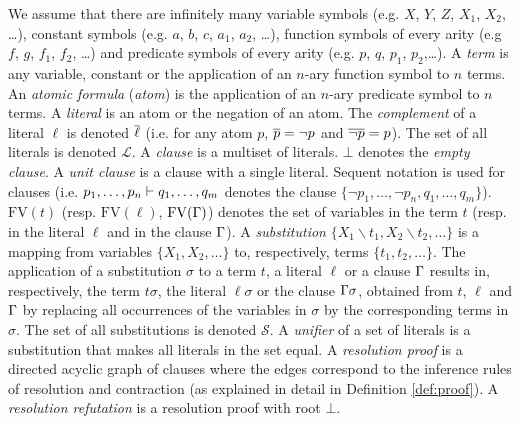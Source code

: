 \documentclass{llncs}
\newcommand{\freevar}[1]{\mathrm{FV}(#1)}
\begin{document}
We assume that there are infinitely many variable symbols (e.g. $X$, $Y$, $Z$, $X_1$, $X_2$, \ldots), constant symbols (e.g. $a$, $b$, $c$, $a_1$, $a_2$, \ldots), function symbols of every arity (e.g $f$, $g$, $f_1$, $f_2$, \ldots) and predicate symbols of every arity (e.g. $p$, $q$, $p_1$, $p_2$,\ldots). A \emph{term} is any variable, constant or the application of an $n$-ary function symbol to $n$ terms.
An \emph{atomic formula} (\emph{atom}) is the application of an $n$-ary predicate symbol to $n$ terms. A \emph{literal} is an atom or the negation of an atom. The
\emph{complement} of a literal $\ell$ is denoted $\overline{\ell}$ (i.e. for any atom $p$,
$\overline{p} = \neg p$ and $\overline{\neg p} = p$). The set of all literals is denoted $\mathcal{L}$. A
\emph{clause} is a multiset of literals. $\bot$ denotes the \emph{empty clause}. A \emph{unit clause} is a clause with a single literal. Sequent notation is used for clauses (i.e. $p_1,\ldots,p_n \vdash q_1,\ldots, q_m$ denotes the clause $\{ \neg p_1,\ldots, \neg p_n, q_1, \ldots, q_m \}$).
$\freevar{t}$ (resp. $\freevar{\ell}$, $\freevar{\clause}$) denotes the set of variables in the term $t$ (resp. in the literal $\ell$ and in the clause $\Gamma$).
A \emph{substitution} $\{ X_1\backslash t_1, X_2 \backslash t_2, \ldots \}$ is a mapping from variables $\{ X_1, X_2, \ldots \}$ to, respectively, terms $\{t_1, t_2, \ldots \}$. The application of a substitution $\sigma$ to a term $t$, a literal $\ell$ or a clause $\Gamma$ results in, respectively, the term $t \sigma$, the literal $\ell \sigma$ or the clause $\Gamma \sigma$, obtained from $t$, $\ell$ and $\Gamma$ by replacing all occurrences of the variables in $\sigma$ by the corresponding terms in $\sigma$. The set of all substitutions is denoted $\mathcal{S}$. A \emph{unifier} of a set of literals is a substitution that makes all literals in the set equal.
A \emph{resolution proof} is a directed acyclic graph of clauses where the edges correspond to the inference rules of resolution and contraction (as explained in detail in Definition \ref{def:proof}). A \emph{resolution refutation} is a resolution proof with root $\bot$.
\end{document}
